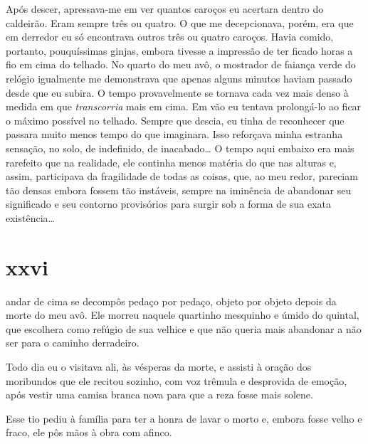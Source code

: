 Após descer, apressava-me em ver quantos caroços eu acertara dentro do
caldeirão. Eram sempre três ou quatro. O que me decepcionava, porém, era que
em derredor eu só encontrava outros três ou quatro caroços. Havia comido,
portanto, pouquíssimas ginjas, embora tivesse a impressão de ter ficado horas
a fio em cima do telhado. No quarto do meu avô, o mostrador de faiança verde
do relógio igualmente me demonstrava que apenas alguns minutos haviam passado
desde que eu subira. O tempo provavelmente se tornava cada vez mais denso à
medida em que \textit{transcorria} mais em cima. Em vão eu tentava
prolongá-lo ao ficar o máximo possível no telhado. Sempre que descia, eu
tinha de reconhecer que passara muito menos tempo do que imaginara. Isso
reforçava minha estranha sensação, no solo, de indefinido, de inacabado\ldots
{} O tempo aqui embaixo era mais rarefeito que na realidade, ele continha
menos matéria do que nas alturas e, assim, participava da fragilidade de
todas as coisas, que, ao meu redor, pareciam tão densas embora fossem tão
instáveis, sempre na iminência de abandonar seu significado e seu contorno
provisórios para surgir sob a forma de sua exata existência\ldots{}


\section{xxvi} 

 andar de cima se decompôs pedaço por pedaço, objeto por
 objeto depois da morte do meu avô. Ele morreu naquele quartinho mesquinho e
 úmido do quintal, que escolhera como refúgio de sua velhice e que não queria
 mais abandonar a não ser para o caminho derradeiro.

Todo dia eu o visitava ali, às vésperas da morte, e assisti à oração dos
moribundos que ele recitou sozinho, com voz trêmula e desprovida de emoção,
após vestir uma camisa branca nova para que a reza fosse mais solene.


Esse tio pediu à família para ter a honra de lavar o morto e, embora fosse
velho e fraco, ele pôs mãos à obra com afinco.

